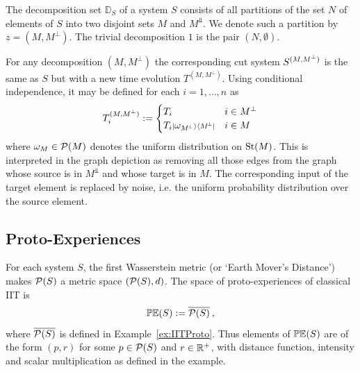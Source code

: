 The decomposition set $\mathbb D_S$ of a system $S$ consists of all partitions of the set $N$ of elements of $S$ into two disjoint sets $M$ and $M^\Bot$. We denote such a partition by $z = (M, M^\bot)$. The trivial decomposition $1$ is the pair $(N,\emptyset)$. 

For any decomposition $(M, M^\bot)$ the corresponding cut system ${S}^{(M,M^\bot)}$ is the same as $S$ but with a new time evolution $T^{(M,M^\bot)}$. Using conditional independence, it may be defined for each $i = 1, \dots, n$ as
\begin{equation}\label{eq:ClCut}
T^{(M,M^\bot)}_i
:=
\begin{cases}
T_i & i \in M^\bot \\
T_i{\scriptstyle |}{\omega_{M^{\!\scriptscriptstyle \bot}}}{\scriptstyle \rangle}{\scriptstyle \langle M^{\!\scriptscriptstyle \bot} |} & i \in M
\end{cases} 
\end{equation}
where ${\omega_{M}} \in \mathcal P(M)$ denotes the uniform distribution on $\text{St}(M)$. 
This is interpreted in the graph depiction as removing all those edges from the graph whose source is in $M^\Bot$ and whose target is in $M$. The corresponding input of the target element is replaced by noise, i.e. the uniform probability distribution over the source element. 

\subsection{Proto-Experiences}
For each system $S$, the first Wasserstein metric (or `Earth Mover's Distance') makes $\mathcal P(S)$ a metric space $(\mathcal P(S),d)$.
The space of proto-experiences of classical IIT is
\begin{equation}\label{eq:ProtoClassical}
\mathbb{PE}(S) := \overline{\mathcal P(S)} \:,
\end{equation}
where $\overline{\mathcal P(S)}$ is defined in Example~\ref{ex:IITProto}.
Thus elements of $\mathbb{PE}(S)$ are of the form $(p, r)$ for some $p \in \mathcal P(S)$ and $r \in \mathbb{R}^+$, with distance function, intensity and scalar multiplication as defined in the example.



